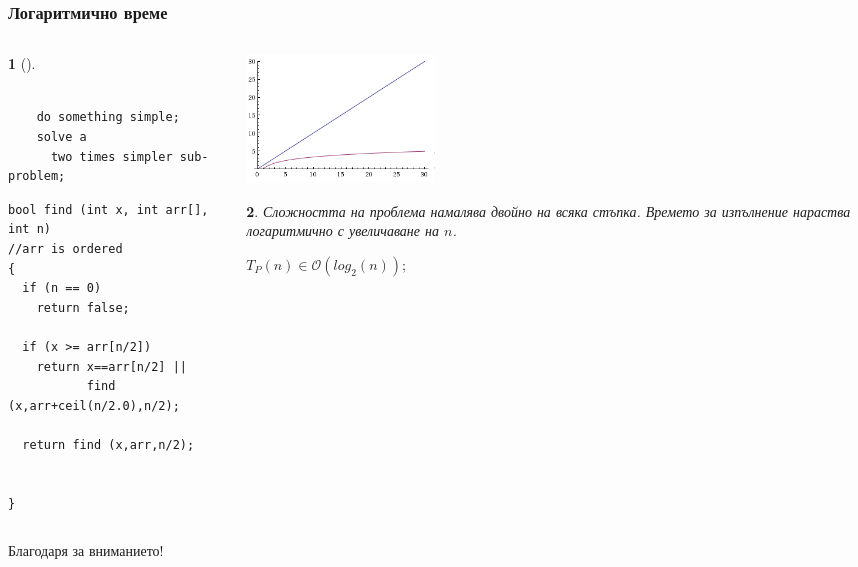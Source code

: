 \documentclass{beamer}
\newtheorem*{remark}{}
\begin{document}
\begin{frame}[fragile]
\frametitle{Логаритмично време}

\vspace{-30px}

\begin{columns}[t]
  \begin{column}{0.6\textwidth}
\begin{remark}[]
  \begin{lstlisting}[mathescape]
  
    do something simple;
    solve a 
      two times simpler sub-problem;

  \end{lstlisting}
\end{remark}

\begin{flushleft}
\begin{lstlisting}
bool find (int x, int arr[], int n)
//arr is ordered
{
  if (n == 0)
    return false;

  if (x >= arr[n/2])
    return x==arr[n/2] || 
           find (x,arr+ceil(n/2.0),n/2);

  return find (x,arr,n/2);


}
\end{lstlisting}
\end{flushleft}




  \end{column}
  \begin{column}{0.4\textwidth}

   \includegraphics[width=5cm]{images/logf}
    \begin{flushleft}
    \begin{remark}
      Сложността на проблема намалява двойно на всяка стъпка.
      Времето за изпълнение нараства логаритмично с увеличаване на $n$.

      $T_P(n) \in \mathcal{O}(log_2(n));$
    \end{remark}
      
    \end{flushleft}


  \end{column}
\end{columns}

\end{frame}

\begin{frame}
\centerline{Благодаря за вниманието!}
\end{frame}
\end{document}
